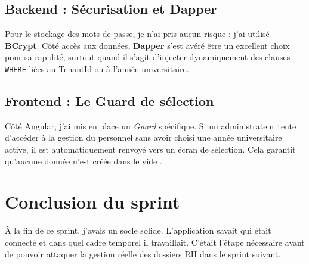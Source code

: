 \subsection{Backend : Sécurisation et Dapper}

Pour le stockage des mots de passe, je n'ai pris aucun risque : j'ai utilisé \textbf{BCrypt}. Côté accès aux données, \textbf{Dapper} s'est avéré être un excellent choix pour sa rapidité, surtout quand il s'agit d'injecter dynamiquement des clauses \texttt{WHERE} liées au TenantId ou à l'année universitaire.

\subsection{Frontend : Le Guard de sélection}

Côté Angular, j'ai mis en place un \textit{Guard} spécifique. Si un administrateur tente d'accéder à la gestion du personnel sans avoir choisi une année universitaire active, il est automatiquement renvoyé vers un écran de sélection. Cela garantit qu'aucune donnée n'est créée \og dans le vide \fg{}.

\section{Conclusion du sprint}

À la fin de ce sprint, j'avais un socle solide. L'application savait qui était connecté et dans quel cadre temporel il travaillait. C'était l'étape nécessaire avant de pouvoir attaquer la gestion réelle des dossiers RH dans le sprint suivant.

